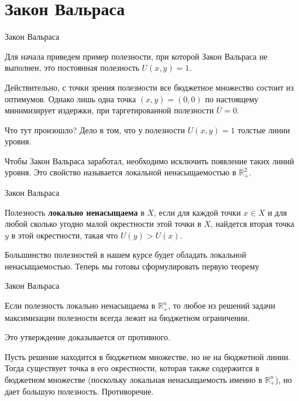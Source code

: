 \documentclass{beamer}
\begin{document}
\section{Закон Вальраса}

\begin{frame}{Закон Вальраса}

Для начала приведем пример полезности, при которой Закон Вальраса не выполнен, это постоянная полезность $U(x,y) = 1$. 

Действительно, с точки зрения полезности все бюджетное множество состоит из оптимумов. Однако лишь одна точка $(x,y)=(0,0)$ по настоящему минимизирует издержки, при таргетированной полезности $\bar U = 0$. 

Что тут произошло? Дело в том, что у полезности $U(x,y) = 1$ толстые линии уровня. 

Чтобы Закон Вальраса заработал, необходимо исключить появление таких линий уровня. Это свойство называется локальной ненасыщаемостью в $\mathbb{R}^2_{+}$.

\end{frame}

\begin{frame}{Закон Вальраса}

\begin{definition}
Полезность \textbf{локально ненасыщаема} в $X$, если для каждой точки $x \in X$ и для любой сколько угодно малой окрестности этой точки в $X$, найдется вторая точка $y$ в этой окрестности, такая что $U(y)>U(x)$.
\end{definition}

Большинство полезностей в нашем курсе будет обладать локальной ненасыщаемостью. Теперь мы готовы сформулировать первую теорему

\end{frame}

\begin{frame}{Закон Вальраса}

\begin{theorem}
Если полезность локально ненасыщаема в $\mathbb{R}^n_{+}$, то любое из решений задачи максимизации полезности всегда лежит на бюджетном ограничении.
\end{theorem}

Это утверждение доказывается от противного. 

Пусть решение находится в бюджетном множестве, но не на бюджетной линии. Тогда существует точка в его окрестности, которая также содержится в бюджетном множестве (поскольку локальная ненасыщаемость именно в $\mathbb{R}^n_{+}$), но дает большую полезность. Противоречие.

\end{frame}
\end{document}
